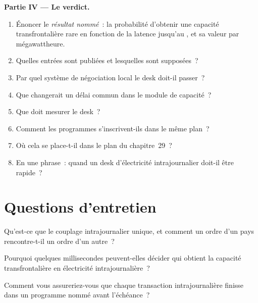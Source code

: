 \begin{problem}
\medskip\noindent\textbf{Partie IV --- Le verdict.}
\begin{enumerate}[resume]
\item Énoncer le \emph{résultat nommé}~: la probabilité d'obtenir une capacité transfrontalière rare en fonction de la latence jusqu'au
  , et sa valeur par mégawattheure.
\item Quelles entrées sont publiées et lesquelles sont supposées~?
\item Par quel système de négociation local le desk doit-il passer~?
\item Que changerait un délai commun dans le module de capacité~?
\item Que doit mesurer le desk~?
\item Comment les programmes s'inscrivent-ils dans le même plan~?
\item Où cela se place-t-il dans le plan du chapitre~29~?
\item En une phrase~: quand un desk d'électricité intrajournalier doit-il être rapide~?
\end{enumerate}
\end{problem}

\section{Questions d'entretien}

\begin{interviewq}\label{iq:nw:power-commodities-and-betting-connectivity:1}
Qu'est-ce que le couplage intrajournalier unique, et comment un ordre d'un pays rencontre-t-il un ordre d'un autre~?
\end{interviewq}

\begin{interviewq}\label{iq:nw:power-commodities-and-betting-connectivity:2}
Pourquoi quelques millisecondes peuvent-elles décider qui obtient la capacité transfrontalière en électricité intrajournalière~?
\end{interviewq}

\begin{interviewq}\label{iq:nw:power-commodities-and-betting-connectivity:3}
Comment vous assureriez-vous que chaque transaction intrajournalière finisse dans un programme nommé avant l'échéance~?
\end{interviewq}

